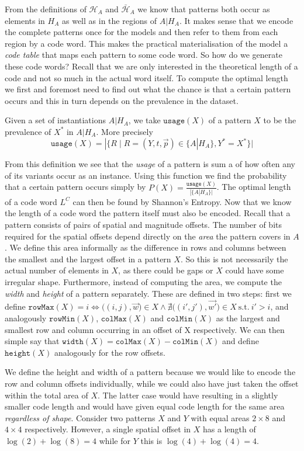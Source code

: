 \documentclass{llncs}
\begin{document}
From the definitions of $\mathcal{H}_A$ and $\bar{\mathcal{H}}_A$ we know that patterns both occur as elements in $H_A$ as well as in the regions of $A|H_A$. It makes sense that we encode the complete patterns once for the models and then refer to them from each region by a code word. This makes the practical materialisation of the model a \emph{code table} that maps each pattern to some code word. So how do we generate these code words? Recall that we are only interested in the theoretical length of a code and not so much in the actual word itself. To compute the optimal length we first and foremost need to find out what the chance is that a certain pattern occurs and this in turn depends on the prevalence in the dataset.
\begin{definition}
Given a set of instantiations $A|H_A$, we take $\mathtt{usage}(X)$ of a pattern $X$ to be the prevalence of $X^*$ in $A|H_A$. More precisely 
$$\mathtt{usage}(X) = |\{R\mid R=(Y,t,\vec{p}) \in \{A|H_A\}, Y^*=X^*\}|$$
\end{definition}
From this definition we see that the \emph{usage} of a pattern is sum a of how often any of its variants occur as an instance. Using this function we find the probability that a certain pattern occurs simply by $P(X)=\frac{\mathtt{usage}(X)}{|\{A|H_A\}|}$. The optimal length of a code word $L^C$ can then be found by Shannon's Entropy. 
Now that we know the length of a code word the pattern itself must also be encoded. Recall that a pattern consists of pairs of spatial and magnitude offsets. The number of bits required for the spatial offsets depend directly on the \emph{area} the pattern covers in $A$. We define this area informally as the difference in rows and columns between the smallest and the largest offset in a pattern $X$. So this is not necessarily the actual number of elements in $X$, as there could be gaps or $X$ could have some irregular shape. Furthermore, instead of computing the area, we compute the \emph{width} and \emph{height} of a pattern separately. These are defined in two steps: first we define $\mathtt{rowMax}(X) = i \iff \big((i,j),\vec{w}\big) \in X \land \nexists \big((i',j'),\vec{w'}\big) \in X \ \mathrm{s.t.} \ i'>i$, and analogously $\mathtt{rowMin}(X)$, $\mathtt{colMax}(X)$ and $\mathtt{colMin}(X)$ as the largest and smallest row and column occurring in an offset of X respectively. We can then simple say that $\mathtt{width}(X) = \mathtt{colMax}(X) - \mathtt{colMin}(X)$ and define $\mathtt{height}(X)$ analogously for the row offsets. 

We define the height and width of a pattern because we would like to encode the row and column offsets individually, while we could also have just taken the offset within the total area of $X$. The latter case would have resulting in a slightly smaller code length and would have given equal code length for the same area \emph{regardless of shape}. Consider two patterns $X$ and $Y$ with equal areas $2\times 8$ and $4\times 4$ respectively. However, a single spatial offset in $X$ has a length of $\log(2) + \log(8)=4$ while for $Y$ this is $\log(4) + \log(4) = 4$.
\end{document}
